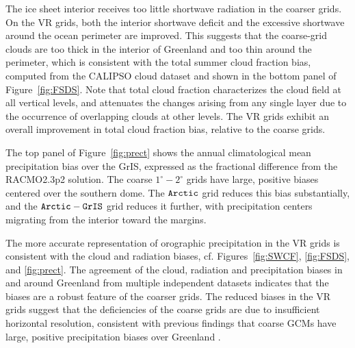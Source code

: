 \documentclass[draft]{agujournal2019}
\begin{document}
The ice sheet interior receives too little shortwave radiation in the coarser grids. On the VR grids, both the interior shortwave deficit and the excessive shortwave around the ocean perimeter are improved. This suggests that the coarse-grid clouds are too thick in the interior of Greenland and too thin around the perimeter, which is consistent with the total summer cloud fraction bias, computed from the CALIPSO cloud dataset and shown in the bottom panel of Figure~\ref{fig:FSDS}. Note that total cloud fraction characterizes the cloud field at all vertical levels, and attenuates the changes arising from any single layer due to the occurrence of overlapping clouds at other levels. The VR grids exhibit an overall improvement in total cloud fraction bias, relative to the coarse grids.

The top panel of Figure~\ref{fig:prect} shows the annual climatological mean precipitation bias over the GrIS, expressed as the fractional difference from the RACMO2.3p2 solution. The coarse $1^{\circ}-2^{\circ}$ grids have large, positive biases centered over the southern dome. The $\tt Arctic$ grid reduces this bias substantially, and the $\tt Arctic-GrIS$ grid reduces it further, with precipitation centers migrating from the interior toward the margins.

The more accurate representation of orographic precipitation in the VR grids is consistent with the cloud and radiation biases, cf. Figures~\ref{fig:SWCF}, \ref{fig:FSDS}, and \ref{fig:prect}. The agreement of the cloud, radiation and precipitation biases in and around Greenland from multiple independent datasets indicates that the biases are a robust feature of the coarser grids. The reduced biases in the VR grids suggest that the deficiencies of the coarse grids are due to insufficient horizontal resolution, consistent with previous findings that coarse GCMs have large, positive precipitation biases over Greenland \cite{P2000GPC,VETAL2018TC}.
\end{document}

